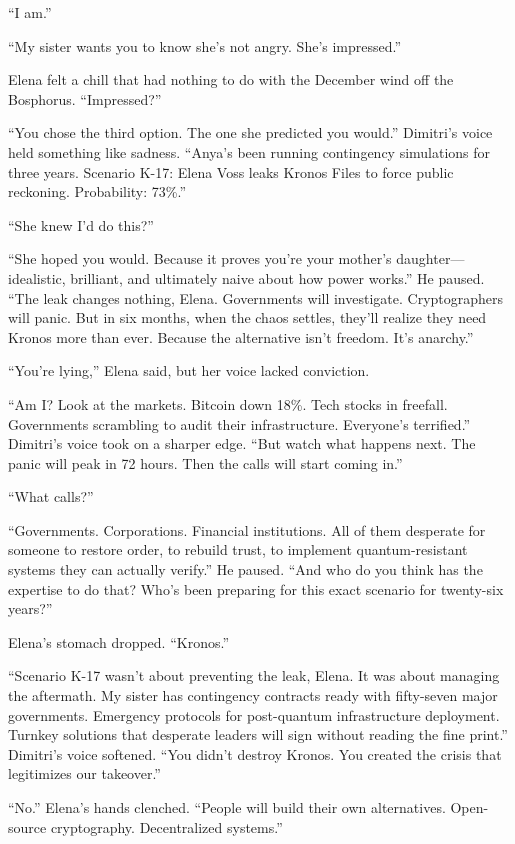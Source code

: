 ``I am.''

``My sister wants you to know she's not angry. She's impressed.''

Elena felt a chill that had nothing to do with the December wind off the Bosphorus. ``Impressed?''

``You chose the third option. The one she predicted you would.'' Dimitri's voice held something like sadness. ``Anya's been running contingency simulations for three years. Scenario K-17: Elena Voss leaks Kronos Files to force public reckoning. Probability: 73\%.''

``She knew I'd do this?''

``She hoped you would. Because it proves you're your mother's daughter---idealistic, brilliant, and ultimately naive about how power works.'' He paused. ``The leak changes nothing, Elena. Governments will investigate. Cryptographers will panic. But in six months, when the chaos settles, they'll realize they need Kronos more than ever. Because the alternative isn't freedom. It's anarchy.''

``You're lying,'' Elena said, but her voice lacked conviction.

``Am I? Look at the markets. Bitcoin down 18\%. Tech stocks in freefall. Governments scrambling to audit their infrastructure. Everyone's terrified.'' Dimitri's voice took on a sharper edge. ``But watch what happens next. The panic will peak in 72 hours. Then the calls will start coming in.''

``What calls?''

``Governments. Corporations. Financial institutions. All of them desperate for someone to restore order, to rebuild trust, to implement quantum-resistant systems they can actually verify.'' He paused. ``And who do you think has the expertise to do that? Who's been preparing for this exact scenario for twenty-six years?''

Elena's stomach dropped. ``Kronos.''

``Scenario K-17 wasn't about preventing the leak, Elena. It was about managing the aftermath. My sister has contingency contracts ready with fifty-seven major governments. Emergency protocols for post-quantum infrastructure deployment. Turnkey solutions that desperate leaders will sign without reading the fine print.'' Dimitri's voice softened. ``You didn't destroy Kronos. You created the crisis that legitimizes our takeover.''

``No.'' Elena's hands clenched. ``People will build their own alternatives. Open-source cryptography. Decentralized systems.''

